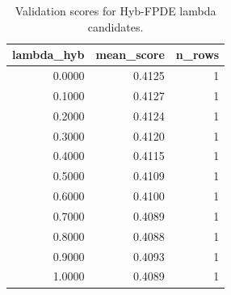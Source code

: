 \begin{table}[t]
\caption{Validation scores for Hyb-FPDE lambda candidates.}
\label{tab:lambda_distribution_computed}
\centering
\begin{tabular}{rrr}
\toprule
lambda\_hyb & mean\_score & n\_rows \\
\midrule
0.0000 & 0.4125 & 1 \\
0.1000 & 0.4127 & 1 \\
0.2000 & 0.4124 & 1 \\
0.3000 & 0.4120 & 1 \\
0.4000 & 0.4115 & 1 \\
0.5000 & 0.4109 & 1 \\
0.6000 & 0.4100 & 1 \\
0.7000 & 0.4089 & 1 \\
0.8000 & 0.4088 & 1 \\
0.9000 & 0.4093 & 1 \\
1.0000 & 0.4089 & 1 \\
\bottomrule
\end{tabular}

\end{table}

